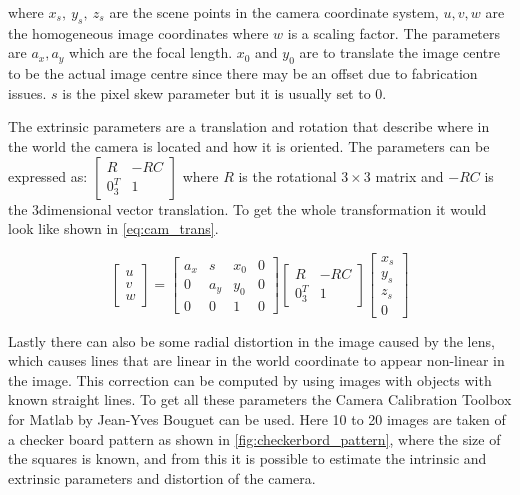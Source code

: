where $x_s, ~y_s, ~z_s$ are the scene points in the camera coordinate system, $u, v, w$ are the homogeneous image coordinates where $w$ is a scaling factor. The parameters are $a_x, a_y$ which are the focal length. $x_0$ and $y_0$ are to translate the image centre to be the actual image centre since there may be an offset due to fabrication issues.  $s$ is the pixel skew parameter but it is usually set to 0.

The extrinsic parameters are a translation and rotation that describe where in the world the camera is located and how it is oriented. The parameters can be expressed as:
$ \begin{bmatrix}
R & -RC  \\
0_{3}^{T} & 1 
\end{bmatrix}  $
where $R$ is the rotational $3\times 3$ matrix and $-RC$ is the $3$dimensional vector translation. To get the whole transformation it would look like shown in \autoref{eq:cam_trans}.

\begin{equation}\label{eq:cam_trans}
\begin{bmatrix}
u \\
v \\
w 
\end{bmatrix} 
 =
\begin{bmatrix}
a_x & s & x_0 & 0 \\
0 & a_y & y_0 & 0 \\
0 & 0 & 1 & 0 
\end{bmatrix}  
\begin{bmatrix}
R & -RC  \\
0_{3}^{T} & 1 
\end{bmatrix}
\begin{bmatrix}
x_s \\
y_s \\
z_s \\
0 
\end{bmatrix}
\end{equation}

Lastly there can also be some radial distortion in the image caused by the lens, which causes lines that are linear in the world coordinate to appear non-linear in the image. This correction can be computed by using images with objects with known straight lines. To get all these parameters the Camera Calibration Toolbox for Matlab by Jean-Yves Bouguet can be used.  Here 10 to 20 images are taken of a checker board pattern as shown in \autoref{fig:checkerbord_pattern}, where the size of the squares is known, and from this it is possible to estimate the intrinsic and extrinsic parameters and distortion of the camera.

